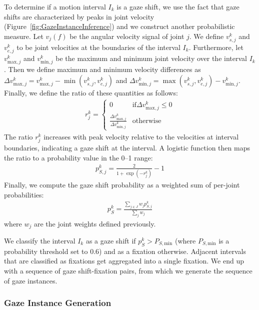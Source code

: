 To determine if a motion interval $I_k$ is a gaze shift, we use the fact that gaze shifts are characterized by peaks in joint velocity (Figure~\ref{fig:GazeInstanceInference}) and we construct another probabilistic measure. Let $v_j(f)$ be the angular velocity signal of joint $j$. We define $v_{s,j}^k$ and $v_{e,j}^k$ to be joint velocities at the boundaries of the interval $I_k$. Furthermore, let $v_{\mathrm{max},j}^k$ and $v_{\mathrm{min},j}^k$ be the maximum and minimum joint velocity over the interval $I_k$. Then we define maximum and minimum velocity differences as $\Delta v_{\mathrm{max},j}^k = v_{\mathrm{max},j}^k - \mathop{min} (v_{s,j}^k, v_{e,j}^k)$ and $\Delta v_{\mathrm{min},j}^k = \mathop{max} (v_{s,j}^k, v_{e,j}^k) - v_{\mathrm{min},j}^k$. Finally, we define the ratio of these quantities as follows:
%
\begin{align} \label{eq:GazeShiftRatio}
r_j^k =
\begin{cases}
0 & \text{if} \Delta v_{\mathrm{max},j}^k \leq 0 \\
\frac{\Delta v_{\mathrm{max},j}^k}{\Delta v_{\mathrm{min},j}^k} & \text{otherwise}
\end{cases}
\end{align}
%
The ratio $r_j^k$ increases with peak velocity relative to the velocities at interval boundaries, indicating a gaze shift at the interval. A logistic function then maps the ratio to a probability value in the 0--1 range:
%
\begin{align} \label{eq:GazeShiftProbability}
p_{S,j}^k = \frac{2}{1 + \mathop{exp}(-r_j^k)} - 1
\end{align}
%
Finally, we compute the gaze shift probability as a weighted sum of per-joint probabilities:
%
\begin{align} \label{eq:GazeShiftGlobalProbability}
p_S^k = \frac{\sum_{j \in J} w_j p_{S,j}^k}{\sum_j w_j}
\end{align}
%
where $w_j$ are the joint weights defined previously.

We classify the interval $I_k$ as a gaze shift if $p_S^k > P_{S,\mathrm{min}}$ (where $P_{S,\mathrm{min}}$ is a probability threshold set to 0.6) and as a fixation otherwise. Adjacent intervals that are classified as fixations get aggregated into a single fixation. We end up with a sequence of gaze shift-fixation pairs, from which we generate the sequence of gaze instances.

\subsubsection{Gaze Instance Generation}

